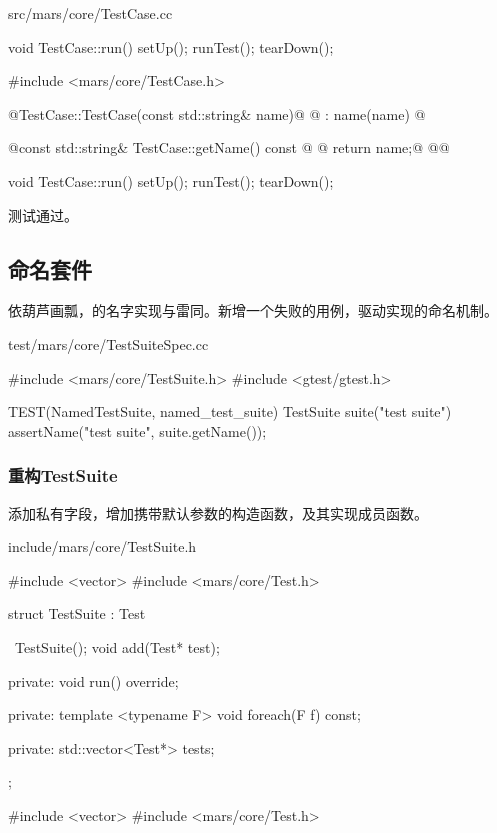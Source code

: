 \begin{content}
\begin{diff}{src/mars/core/TestCase.cc}
\begin{minicpp}
void TestCase::run() {
  setUp();
  runTest();
  tearDown();
}
 \end{minicpp}
\tcblower
 \begin{minicpp}
#include <mars/core/TestCase.h>

@TestCase::TestCase(const std::string& name)@
@  : name(name) {}@

@const std::string& TestCase::getName() const {@
@  return name;@
@}@

void TestCase::run() {
  setUp();
  runTest();
  tearDown();
}
 \end{minicpp}
\end{diff}

测试通过。

\subsection{命名套件}

依葫芦画瓢，的名字实现与雷同。新增一个失败的用例，驱动实现的命名机制。

\begin{nodiff}{test/mars/core/TestSuiteSpec.cc}
 \begin{c++}
#include <mars/core/TestSuite.h>
#include <gtest/gtest.h>

TEST(NamedTestSuite, named_test_suite) {
  TestSuite suite("test suite")
  assertName("test suite", suite.getName());
}
 \end{c++}
\end{nodiff}

\subsubsection{重构TestSuite}

添加私有字段，增加携带默认参数的构造函数，及其实现成员函数。

\begin{diff}{include/mars/core/TestSuite.h}
 \begin{minicpp}
#include <vector>
#include <mars/core/Test.h>

struct TestSuite : Test {
  ~TestSuite();
  void add(Test* test);

private:
  void run() override;

private:
  template <typename F>
  void foreach(F f) const;

private:
  std::vector<Test*> tests;
};
 \end{minicpp}
\tcblower
 \begin{minicpp}
#include <vector>
#include <mars/core/Test.h>


\end{minicpp}
\end{diff}
\end{content}
